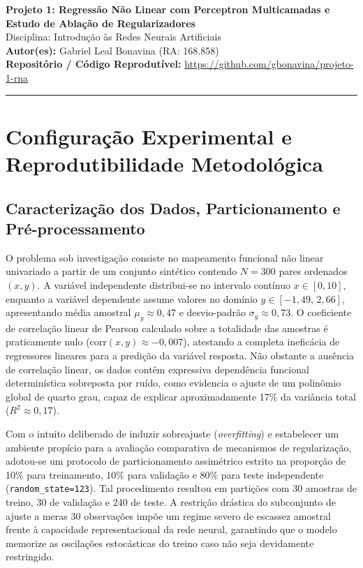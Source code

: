 \documentclass[11pt,a4paper]{article}
\begin{document}
\begin{center}
    {\LARGE \textbf{Projeto 1: Regressão Não Linear com Perceptron Multicamadas e Estudo de Ablação de Regularizadores}} \\[0.4em]
    {\large Disciplina: Introdução às Redes Neurais Artificiais} \\[0.3em]
    \textbf{Autor(es):} Gabriel Leal Bonavina (RA: 168.858) \\[0.2em]
    \textbf{Repositório / Código Reprodutível:} \url{https://github.com/gbonavina/projeto-1-rna} 
\end{center}
\vspace{-0.4em}
\hrule
\vspace{0.8em}

\section{Configuração Experimental e Reprodutibilidade Metodológica}

\subsection{Caracterização dos Dados, Particionamento e Pré-processamento}
O problema sob investigação consiste no mapeamento funcional não linear univariado a partir de um conjunto sintético contendo $N = 300$ pares ordenados $(x, y)$. A variável independente distribui-se no intervalo contínuo $x \in [0, 10]$, enquanto a variável dependente assume valores no domínio $y \in [-1{,}49,\, 2{,}66]$, apresentando média amostral $\mu_y \approx 0{,}47$ e desvio-padrão $\sigma_y \approx 0{,}73$. O coeficiente de correlação linear de Pearson calculado sobre a totalidade das amostras é praticamente nulo ($\mathrm{corr}(x,y) \approx -0{,}007$), atestando a completa ineficácia de regressores lineares para a predição da variável resposta. Não obstante a ausência de correlação linear, os dados contêm expressiva dependência funcional determinística sobreposta por ruído, como evidencia o ajuste de um polinômio global de quarto grau, capaz de explicar aproximadamente 17\% da variância total ($R^2 \approx 0{,}17$).

Com o intuito deliberado de induzir sobreajuste (\textit{overfitting}) e estabelecer um ambiente propício para a avaliação comparativa de mecanismos de regularização, adotou-se um protocolo de particionamento assimétrico estrito na proporção de 10\% para treinamento, 10\% para validação e 80\% para teste independente (\texttt{random\_state=123}). Tal procedimento resultou em partições com 30 amostras de treino, 30 de validação e 240 de teste. A restrição drástica do subconjunto de ajuste a meras 30 observações impõe um regime severo de escassez amostral frente à capacidade representacional da rede neural, garantindo que o modelo memorize as oscilações estocásticas do treino caso não seja devidamente restringido.
\end{document}
